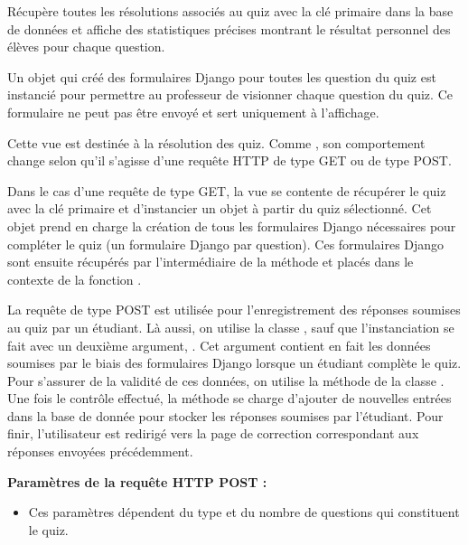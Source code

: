 \documentclass[a4,10pt,french]{sphinxmanual}
\begin{document}

\begin{fulllineitems}
\label{source:quiz.views.advanced_stats}
Récupère toutes les résolutions associés au quiz avec la clé primaire  dans la base de données et affiche
des statistiques précises montrant le résultat personnel des élèves pour chaque question.

Un objet  qui créé des formulaires Django pour toutes les question
du quiz est instancié pour permettre au professeur de visionner 
chaque question du quiz. Ce formulaire ne peut pas être envoyé et sert
uniquement à l'affichage.

\end{fulllineitems}


\begin{fulllineitems}
\label{source:quiz.views.complete}
Cette vue est destinée à la résolution des quiz. Comme , son comportement
change selon qu'il s'agisse d'une requête HTTP de type GET ou de type POST.

Dans le cas d'une requête de type GET, la vue se contente de récupérer le quiz
avec la clé primaire  et d'instancier un objet  à partir
du quiz sélectionné. Cet objet prend en charge la création de tous les formulaires
Django nécessaires pour compléter le quiz (un formulaire Django par question).
Ces formulaires Django sont ensuite récupérés par l'intermédiaire de la méthode
 et placés dans le contexte de la fonction .

La requête de type POST est utilisée pour l'enregistrement des réponses soumises
au quiz par un étudiant. Là aussi, on utilise la classe , sauf que
l'instanciation se fait avec un deuxième argument, . Cet argument contient
en fait les données soumises par le biais des formulaires Django lorsque un
étudiant complète le quiz. Pour s'assurer de la validité de ces données, on
utilise la méthode  de la classe . Une fois le
contrôle effectué, la méthode  se charge d'ajouter de nouvelles
entrées dans la base de donnée pour stocker les réponses soumises par l'étudiant.
Pour finir, l'utilisateur est redirigé vers la page de correction correspondant
aux réponses envoyées précédemment.

\textbf{Paramètres de la requête HTTP POST :}
\begin{itemize}
\item {} 
Ces paramètres dépendent du type et du nombre de questions qui constituent le quiz.

\end{itemize}

\end{fulllineitems}
\end{document}
